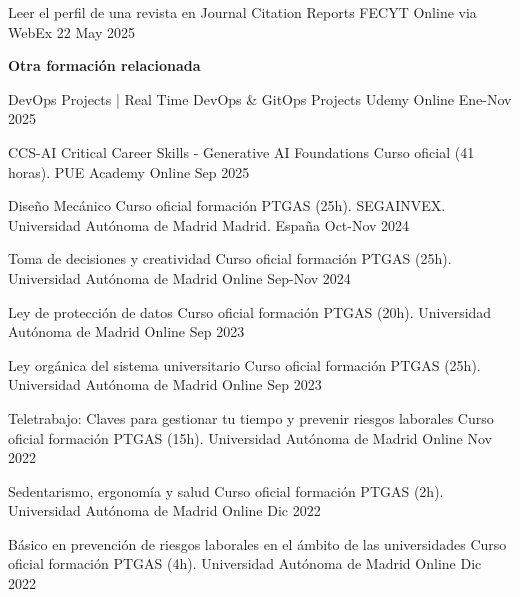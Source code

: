 \begin{cvhonors}
   \cvhonor
   {Leer el perfil de una revista en Journal Citation Reports} %
   {FECYT} %
   {Online via WebEx} %
   {22 May 2025} %
\end{cvhonors}

\textbf{Otra formación relacionada}
\begin{cvhonors}	
   \cvhonor
	{DevOps Projects | Real Time DevOps \& GitOps Projects} %
	{Udemy} %
	{Online} %
	{Ene-Nov 2025} %

   \cvhonor
	{CCS-AI Critical Career Skills - Generative AI Foundations} %
	{Curso oficial (41 horas). PUE Academy} %
	{Online} %
	{Sep 2025} %

  \cvhonor
	{Diseño Mecánico} %
	{Curso oficial formación PTGAS (25h). SEGAINVEX. Universidad Autónoma de Madrid} %
	{Madrid. España} %
	{Oct-Nov 2024} %
    
   \cvhonor
	{Toma de decisiones y creatividad} %
	{Curso oficial formación PTGAS (25h). Universidad Autónoma de Madrid} %
	{Online} %
	{Sep-Nov 2024} %
	
   \cvhonor
	{Ley de protección de datos} %
	{Curso oficial formación PTGAS (20h). Universidad Autónoma de Madrid} %
	{Online} %
	{Sep 2023} %
	
   \cvhonor
	{Ley orgánica del sistema universitario} %
	{Curso oficial formación PTGAS (25h). Universidad Autónoma de Madrid} %
	{Online} %
	{Sep 2023} %

   \cvhonor
	{Teletrabajo: Claves para gestionar tu tiempo y prevenir riesgos laborales} %
	{Curso oficial formación PTGAS (15h). Universidad Autónoma de Madrid} %
	{Online} %
	{Nov 2022} %
	
   \cvhonor
	{Sedentarismo, ergonomía y salud} %
	{Curso oficial formación PTGAS (2h). Universidad Autónoma de Madrid} %
	{Online} %
	{Dic 2022} %

   \cvhonor
	{Básico en prevención de riesgos laborales en el ámbito de las universidades} %
	{Curso oficial formación PTGAS (4h). Universidad Autónoma de Madrid} %
	{Online} %
	{Dic 2022} %


\end{cvhonors}
